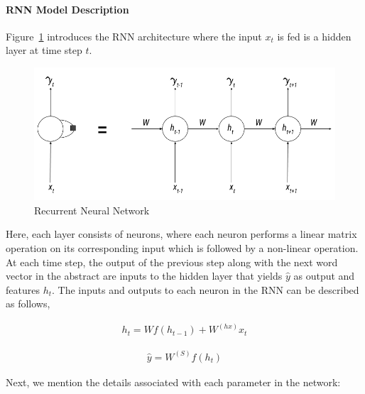 \paragraph{RNN Model Description}
Figure~\ref{fig:rnnarch} introduces the RNN architecture where the input $x_t$ is fed is a hidden layer at time step $t$. 
\begin{figure}
    \centering
    \includegraphics[scale=0.5]{Figures/rnn_figure_1.png}
    \caption{Recurrent Neural Network}
    \label{fig:rnnarch}
\end{figure}
Here, each layer consists of neurons, where each neuron performs a linear matrix operation on its corresponding input which is followed by a non-linear operation. At each time step, the output of the previous step along with the next word vector in the abstract are inputs to the hidden layer that yields $\widehat{y}$ as output and features $h_t$. The inputs and outputs to each neuron in the RNN can be described as follows,

\begin{equation}
\begin{aligned}
	h_t = W f(h_{t-1}) + W^{(hx)}x_t
\end{aligned}
\end{equation}

\begin{equation}
\begin{aligned}
	\widehat{y} = W^{(S)}f(h_{t})
\end{aligned}
\end{equation}

Next, we mention the details associated with each parameter in the network:

